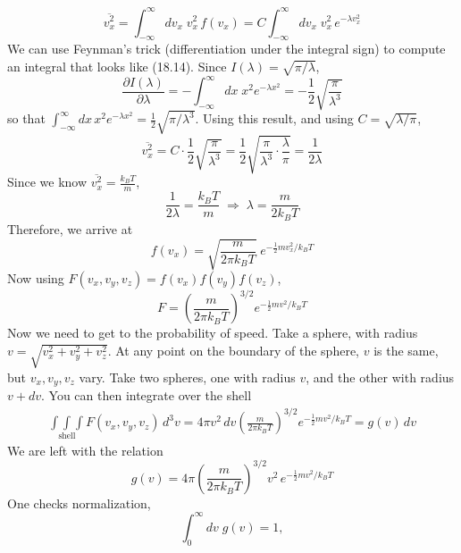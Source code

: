 \documentclass{report}
\numberwithin{equation}{section}
\newcommand{\pd}[2]{\frac{\partial #1}{\partial #2}}
\begin{document}
\begin{equation}
    \overline{v_x^2} = \int^{\infty}_{-\infty}dv_x\;v_x^2\, f(v_x) = C\int^{\infty}_{-\infty}dv_x\; v_x^2\, e^{-\lambda v_x^2}
\end{equation}
We can use Feynman's trick (differentiation under the integral sign) to compute an integral that looks like (18.14). Since $I(\lambda) = \sqrt{\pi/\lambda}$,
\begin{equation}
    \pd{I(\lambda)}{\lambda} = -\int^{\infty}_{-\infty} dx\; x^2 e^{-\lambda x^2} = -\frac{1}{2}\sqrt{\frac{\pi}{\lambda^3}}
\end{equation}
so that $\int_{-\infty}^{\infty} dx\,x^2 e^{-\lambda x^2} = \frac{1}{2}\sqrt{\pi/\lambda^3}$.
Using this result, and using $C = \sqrt{\lambda/\pi}$,
\begin{equation}
    \overline{v_x^2} = C\cdot\frac{1}{2} \sqrt{\frac{\pi}{\lambda^3}} = \frac{1}{2} \sqrt{\frac{\pi}{\lambda^3}\cdot\frac{\lambda}{\pi}}  = \frac{1}{2\lambda}
\end{equation}
Since we know $\overline{v_x^2} =\frac{k_BT}{m}$,
\begin{equation}
    \frac{1}{2\lambda} = \frac{k_BT}{m} \;\Rightarrow\; \lambda = \frac{m}{2k_BT}
\end{equation}
Therefore, we arrive at
\begin{equation}
    f(v_x) = \sqrt{\frac{m}{2\pi k_B T}}\;e^{-\frac{1}{2}mv_x^2/k_BT}
\end{equation}
Now using $F(v_x,v_y,v_z) = f(v_x)f(v_y)f(v_z)$,
\begin{equation*}
    F = \left(\frac{m}{2\pi k_B T}\right)^{3/2}e^{-\frac{1}{2}mv^2/k_BT}
\end{equation*}
Now we need to get to the probability of speed. Take a sphere, with radius $v = \sqrt{v_x^2 + v_y^2 + v_z^2}$. At any point on the boundary of the sphere, $v$ is the same, but $v_x,v_y,v_z$ vary. Take two spheres,
one with radius $v$, and the other with radius $v+dv$. You can then integrate over the shell
\begin{align*}
    \underset{\text{shell}}{\int\int\int}F(v_x,v_y,v_z)\, d^3v = 4\pi v^2\, dv\left(\frac{m}{2\pi k_BT}\right)^{3/2}e^{-\frac{1}{2}mv^2/k_BT} = g(v)\,dv
\end{align*}
We are left with the relation
\begin{equation}
    g(v) = 4\pi \left(\frac{m}{2\pi k_BT}\right)^{3/2}v^2\, e^{-\frac{1}{2}mv^2/k_BT}
\end{equation}
One checks normalization,
\begin{equation}
    \int^{\infty}_{0} dv\; g(v) = 1,
\end{equation}
\end{document}
